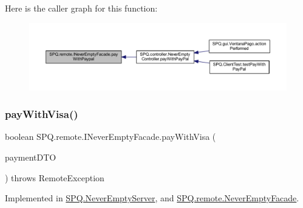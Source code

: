 Here is the caller graph for this function\+:
\nopagebreak
\begin{figure}[H]
\begin{center}
\leavevmode
\includegraphics[width=350pt]{interface_s_p_q_1_1remote_1_1_i_never_empty_facade_a2d34c64f91537d8c7138094e418de785_icgraph}
\end{center}
\end{figure}
\mbox{\label{interface_s_p_q_1_1remote_1_1_i_never_empty_facade_a3b7058d95e7b73bdcc09220ecfc2d744}} 
\subsubsection{\texorpdfstring{pay\+With\+Visa()}{payWithVisa()}}
{\footnotesize\ttfamily boolean S\+P\+Q.\+remote.\+I\+Never\+Empty\+Facade.\+pay\+With\+Visa (\begin{DoxyParamCaption}\item[{\mbox{\hyperlink{class_s_p_q_1_1dto_1_1_payment_d_t_o}{Payment\+D\+TO}}}]{payment\+D\+TO }\end{DoxyParamCaption}) throws Remote\+Exception}



Implemented in \mbox{\hyperlink{class_s_p_q_1_1_never_empty_server_a455fa773e66917007842f9a92243ffa8}{S\+P\+Q.\+Never\+Empty\+Server}}, and \mbox{\hyperlink{class_s_p_q_1_1remote_1_1_never_empty_facade_a0ff9201cf33cb76c43dd85c892af93ba}{S\+P\+Q.\+remote.\+Never\+Empty\+Facade}}.


